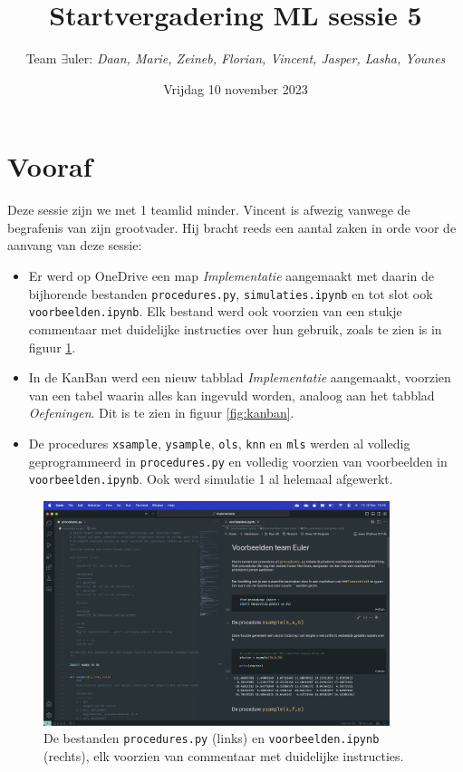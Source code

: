\documentclass{article}
\title{Startvergadering ML sessie 5}
\author{Team $\exists$uler: \textit{Daan, Marie, Zeineb, Florian, Vincent, Jasper, Lasha, Younes}}
\date{Vrijdag 10 november 2023}
\begin{document}
	
	\maketitle
	
	\section*{Vooraf}
	
	Deze sessie zijn we met 1 teamlid minder. Vincent is afwezig vanwege de begrafenis van zijn grootvader. Hij bracht reeds een aantal zaken in orde voor de aanvang van deze sessie:
	
	\begin{itemize}
		\item Er werd op OneDrive een map \textit{Implementatie} aangemaakt met daarin de bijhorende bestanden \texttt{procedures.py}, \texttt{simulaties.ipynb} en tot slot ook \texttt{voorbeelden.ipynb}. Elk bestand werd ook voorzien van een stukje commentaar met duidelijke instructies over hun gebruik, zoals te zien is in figuur \ref{fig:bestanden}.
		\item In de KanBan werd een nieuw tabblad \textit{Implementatie} aangemaakt, voorzien van een tabel waarin alles kan ingevuld worden, analoog aan het tabblad \textit{Oefeningen}. Dit is te zien in figuur \ref{fig:kanban}.
		\item De procedures \texttt{xsample}, \texttt{ysample}, \texttt{ols}, \texttt{knn} en \texttt{mls} werden al volledig geprogrammeerd in \texttt{procedures.py} en volledig voorzien van voorbeelden in \texttt{voorbeelden.ipynb}. Ook werd simulatie 1 al helemaal afgewerkt.
	\end{itemize}
	
	\begin{figure}
		\centering
		\includegraphics[width=0.9\textwidth]{bestanden}
		\caption{De bestanden \texttt{procedures.py} (links) en \texttt{voorbeelden.ipynb} (rechts), elk voorzien van commentaar met duidelijke instructies.}
		\label{fig:bestanden}
	\end{figure}
	
\end{document}
